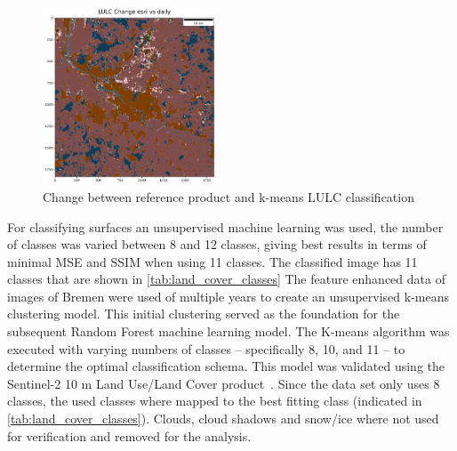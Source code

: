 \documentclass[12pt,a4paper, english,twoside]{article}
\begin{document}
      \begin{figure}
         \begin{center}
         \includegraphics[width=0.46\textwidth]{img/DiffLULC}
       \end{center}
       \caption{Change between reference product and k-means \gls{LULC} classification}\label{fig:lulcDiff}
      \end{figure}
      For classifying surfaces an unsupervised machine learning was used, the number of classes was varied between 8 and 12 classes, giving best results in terms of minimal \gls{MSE} and \gls{SSIM} when using 11 classes.
      The classified image has 11 classes that are shown in \cref{tab:land_cover_classes}
      The feature enhanced data of images of Bremen%
      were used of multiple years to create an unsupervised k-means clustering model.
      This initial clustering served as the foundation for the subsequent Random Forest machine learning model.
      The K-means algorithm was executed with varying numbers of classes – specifically 8, 10, and 11 – to determine the optimal classification schema.
      This model was validated using the Sentinel-2 10 m Land Use/Land Cover product~\autocite{Sentiel10mLULC}. 
      Since the data set only uses 8 classes, the used classes where mapped to the best fitting class (indicated in \cref{tab:land_cover_classes}). 
      Clouds, cloud shadows and snow/ice where not used for verification and removed for the analysis.
\end{document}
